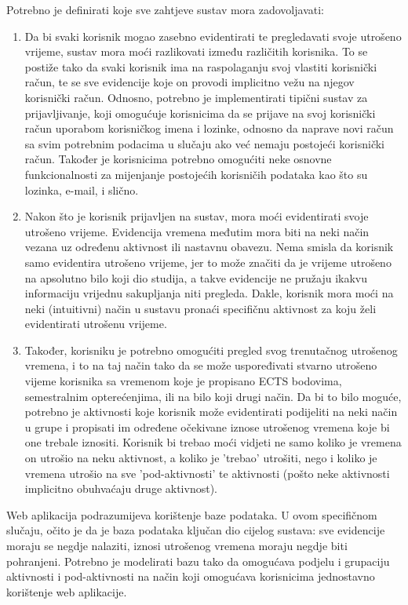 \documentclass[times, utf8, zavrsni]{fer}
\begin{document}
Potrebno je definirati koje sve zahtjeve sustav mora zadovoljavati:
\begin{enumerate}
\item Da bi svaki korisnik mogao zasebno evidentirati te pregledavati svoje utrošeno vrijeme, sustav mora moći razlikovati između različitih korisnika. To se postiže tako da svaki korisnik ima na raspolaganju svoj vlastiti korisnički račun, te se sve evidencije koje on provodi implicitno vežu na njegov korisnički račun. Odnosno, potrebno je implementirati tipični sustav za prijavljivanje, koji omogućuje korisnicima da se prijave na svoj korisnički račun uporabom korisničkog imena i lozinke, odnosno da naprave novi račun sa svim potrebnim podacima u slučaju ako već nemaju postojeći korisnički račun. Također je korisnicima potrebno omogućiti neke osnovne funkcionalnosti za mijenjanje postojećih korisničih podataka kao što su lozinka, e-mail, i slično.

\item Nakon što je korisnik prijavljen na sustav, mora moći evidentirati svoje utrošeno vrijeme. Evidencija vremena međutim mora biti na neki način vezana uz određenu aktivnost ili nastavnu obavezu. Nema smisla da korisnik samo evidentira utrošeno vrijeme, jer to može značiti da je vrijeme utrošeno na apsolutno bilo koji dio studija, a takve evidencije ne pružaju ikakvu informaciju vrijednu sakupljanja niti pregleda. Dakle, korisnik mora moći na neki (intuitivni) način u sustavu pronaći specifičnu aktivnost za koju želi evidentirati utrošenu vrijeme.\clearpage

\item Također, korisniku je potrebno omogućiti pregled svog trenutačnog utrošenog vremena, i to na taj način tako da se može uspoređivati stvarno utrošeno vijeme korisnika sa vremenom koje je propisano ECTS bodovima, semestralnim opterećenjima, ili na bilo koji drugi način. Da bi to bilo moguće, potrebno je aktivnosti koje korisnik može evidentirati podijeliti na neki način u grupe i propisati im određene očekivane iznose utrošenog vremena koje bi one trebale iznositi. Korisnik bi trebao moći vidjeti ne samo koliko je vremena on utrošio na neku aktivnost, a koliko je 'trebao' utrošiti, nego i koliko je vremena utrošio na sve 'pod-aktivnosti' te aktivnosti (pošto neke aktivnosti implicitno obuhvaćaju druge aktivnost).
\end{enumerate}

Web aplikacija podrazumijeva korištenje baze podataka. U ovom specifičnom slučaju, očito je da je baza podataka ključan dio cijelog sustava: sve evidencije moraju se negdje nalaziti, iznosi utrošenog vremena moraju negdje biti pohranjeni. Potrebno je modelirati bazu tako da omogućava podjelu i grupaciju aktivnosti i pod-aktivnosti na način koji omogućava korisnicima jednostavno korištenje web aplikacije.
\end{document}
